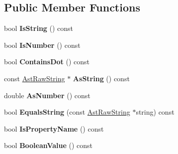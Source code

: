 \subsection*{Public Member Functions}
\begin{DoxyCompactItemize}
\item 
bool {\bfseries Is\+String} () const \hypertarget{classv8_1_1internal_1_1_ast_value_ab70bfc634e17e29db259a26a757a05c9}{}\label{classv8_1_1internal_1_1_ast_value_ab70bfc634e17e29db259a26a757a05c9}

\item 
bool {\bfseries Is\+Number} () const \hypertarget{classv8_1_1internal_1_1_ast_value_a399b9f14cff4101983a3d2842d62c911}{}\label{classv8_1_1internal_1_1_ast_value_a399b9f14cff4101983a3d2842d62c911}

\item 
bool {\bfseries Contains\+Dot} () const \hypertarget{classv8_1_1internal_1_1_ast_value_a56a59b4648a82f91397567d8b1b815f9}{}\label{classv8_1_1internal_1_1_ast_value_a56a59b4648a82f91397567d8b1b815f9}

\item 
const \hyperlink{classv8_1_1internal_1_1_ast_raw_string}{Ast\+Raw\+String} $\ast$ {\bfseries As\+String} () const \hypertarget{classv8_1_1internal_1_1_ast_value_a80e071eba4956e10a281194df8a8668d}{}\label{classv8_1_1internal_1_1_ast_value_a80e071eba4956e10a281194df8a8668d}

\item 
double {\bfseries As\+Number} () const \hypertarget{classv8_1_1internal_1_1_ast_value_aa99e007e6191e0790578ed7addd4e182}{}\label{classv8_1_1internal_1_1_ast_value_aa99e007e6191e0790578ed7addd4e182}

\item 
bool {\bfseries Equals\+String} (const \hyperlink{classv8_1_1internal_1_1_ast_raw_string}{Ast\+Raw\+String} $\ast$string) const \hypertarget{classv8_1_1internal_1_1_ast_value_a57648a16dba0de8154a5a6690a556bf9}{}\label{classv8_1_1internal_1_1_ast_value_a57648a16dba0de8154a5a6690a556bf9}

\item 
bool {\bfseries Is\+Property\+Name} () const \hypertarget{classv8_1_1internal_1_1_ast_value_a42d04cc428b13f93d30262e298565a83}{}\label{classv8_1_1internal_1_1_ast_value_a42d04cc428b13f93d30262e298565a83}

\item 
bool {\bfseries Boolean\+Value} () const \hypertarget{classv8_1_1internal_1_1_ast_value_ab4be5ef2b7f23e682672333fed29f0f2}{}\label{classv8_1_1internal_1_1_ast_value_ab4be5ef2b7f23e682672333fed29f0f2}


\end{DoxyCompactItemize}
